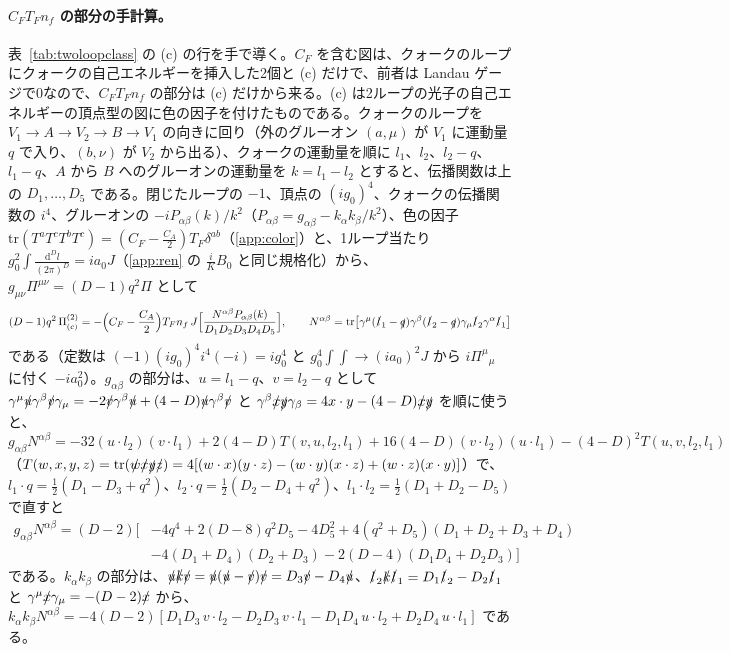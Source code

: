 \documentclass[a4paper,10pt]{ltjsarticle}
\newcommand{\dd}{\mathrm{d}}
\newcommand{\tr}{\mathrm{tr}}
\begin{document}
\paragraph{$C_FT_Fn_f$ の部分の手計算。}表~\ref{tab:twoloopclass} の (c) の行を手で導く。$C_F$ を含む図は、クォークのループにクォークの自己エネルギーを挿入した2個と (c) だけで、前者は Landau ゲージで0なので、$C_FT_Fn_f$ の部分は (c) だけから来る。(c) は2ループの光子の自己エネルギーの頂点型の図に色の因子を付けたものである。クォークのループを $V_1\to A\to V_2\to B\to V_1$ の向きに回り（外のグルーオン $(a,\mu)$ が $V_1$ に運動量 $q$ で入り、$(b,\nu)$ が $V_2$ から出る）、クォークの運動量を順に $l_1$、$l_2$、$l_2-q$、$l_1-q$、$A$ から $B$ へのグルーオンの運動量を $k=l_1-l_2$ とすると、伝播関数は上の $D_1,\dots,D_5$ である。閉じたループの $-1$、頂点の $(ig_0)^4$、クォークの伝播関数の $i^4$、グルーオンの $-iP_{\alpha\beta}(k)/k^2$（$P_{\alpha\beta}=g_{\alpha\beta}-k_\alpha k_\beta/k^2$）、色の因子 $\tr(T^aT^cT^bT^c)=(C_F-\frac{C_A}2)T_F\delta^{ab}$（\ref{app:color}）と、1ループ当たり $g_0^2\int\frac{\dd^Dl}{(2\pi)^D}=ia_0J$（\ref{app:ren} の $\frac iKB_0$ と同じ規格化）から、$g_{\mu\nu}\Pi^{\mu\nu}=(D-1)q^2\Pi$ として
\begin{equation*}
(D-1)q^2\,\Pi^{(2)}_{(c)}=-\Bigl(C_F-\frac{C_A}2\Bigr)T_Fn_f\,J\Bigl[\frac{N^{\alpha\beta}P_{\alpha\beta}(k)}{D_1D_2D_3D_4D_5}\Bigr],\qquad
N^{\alpha\beta}=\tr\bigl[\gamma^\mu(\slashed l_1-\slashed q)\gamma^\beta(\slashed l_2-\slashed q)\gamma_\mu\slashed l_2\gamma^\alpha\slashed l_1\bigr]
\end{equation*}
である（定数は $(-1)(ig_0)^4i^4(-i)=ig_0^4$ と $g_0^4\int\!\!\int\to(ia_0)^2J$ から $i\Pi^\mu{}_\mu$ に付く $-ia_0^2$）。$g_{\alpha\beta}$ の部分は、$u=l_1-q$、$v=l_2-q$ として $\gamma^\mu\slashed u\gamma^\beta\slashed v\gamma_\mu=-2\slashed v\gamma^\beta\slashed u+(4-D)\slashed u\gamma^\beta\slashed v$ と $\gamma^\beta\slashed x\slashed y\gamma_\beta=4x\cdot y-(4-D)\slashed x\slashed y$ を順に使うと、$g_{\alpha\beta}N^{\alpha\beta}=-32(u\cdot l_2)(v\cdot l_1)+2(4-D)T(v,u,l_2,l_1)+16(4-D)(v\cdot l_2)(u\cdot l_1)-(4-D)^2T(u,v,l_2,l_1)$（$T(w,x,y,z)=\tr(\slashed w\slashed x\slashed y\slashed z)=4[(w\cdot x)(y\cdot z)-(w\cdot y)(x\cdot z)+(w\cdot z)(x\cdot y)]$）で、$l_1\cdot q=\frac12(D_1-D_3+q^2)$、$l_2\cdot q=\frac12(D_2-D_4+q^2)$、$l_1\cdot l_2=\frac12(D_1+D_2-D_5)$ で直すと
\begin{equation*}
\begin{aligned}
g_{\alpha\beta}N^{\alpha\beta}=(D-2)\bigl[&-4q^4+2(D-8)q^2D_5-4D_5^2+4(q^2+D_5)(D_1+D_2+D_3+D_4)\\
&-4(D_1+D_4)(D_2+D_3)-2(D-4)(D_1D_4+D_2D_3)\bigr]
\end{aligned}
\end{equation*}
である。$k_\alpha k_\beta$ の部分は、$\slashed u\slashed k\slashed v=\slashed u(\slashed u-\slashed v)\slashed v=D_3\slashed v-D_4\slashed u$、$\slashed l_2\slashed k\slashed l_1=D_1\slashed l_2-D_2\slashed l_1$ と $\gamma^\mu\slashed x\gamma_\mu=-(D-2)\slashed x$ から、$k_\alpha k_\beta N^{\alpha\beta}=-4(D-2)[D_1D_3\,v\cdot l_2-D_2D_3\,v\cdot l_1-D_1D_4\,u\cdot l_2+D_2D_4\,u\cdot l_1]$ である。
\end{document}
